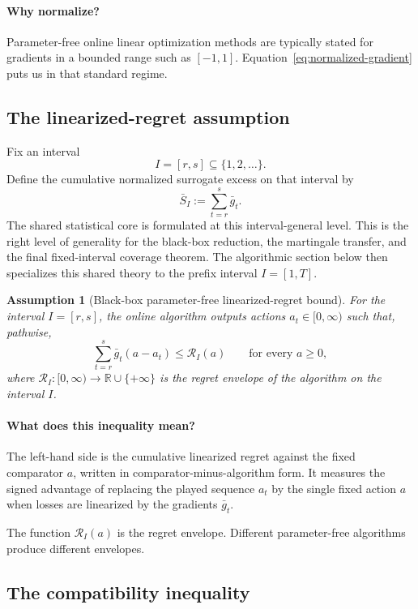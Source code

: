 \documentclass[11pt]{article}
\newtheorem{assumption}{Assumption}
\newcommand{\R}{\mathbb{R}}
\newcommand{\1}{\mathbf{1}}
\begin{document}
\paragraph{Why normalize?}
Parameter-free online linear optimization methods are typically stated for gradients in a bounded range such as $[-1,1]$. Equation~\eqref{eq:normalized-gradient} puts us in that standard regime.

\subsection{The linearized-regret assumption}

Fix an interval
\[
I=[r,s]\subseteq\{1,2,\dots\}.
\]
Define the cumulative normalized surrogate excess on that interval by
\[
\bar S_I:=\sum_{t=r}^s \bar g_t.
\]
The shared statistical core is formulated at this interval-general level. This is the right level of generality for the black-box reduction, the martingale transfer, and the final fixed-interval coverage theorem. The algorithmic section below then specializes this shared theory to the prefix interval $I=[1,T]$.

\begin{assumption}[Black-box parameter-free linearized-regret bound]
\label{ass:linreg-main}
For the interval $I=[r,s]$, the online algorithm outputs actions $a_t\in[0,\infty)$ such that, pathwise,
\begin{equation}
\label{eq:linreg-assumption}
\sum_{t=r}^s \bar g_t(a-a_t)\le \mathcal R_I(a)
\qquad\text{for every }a\ge 0,
\end{equation}
where $\mathcal R_I:[0,\infty)\to\R\cup\{+\infty\}$ is the regret envelope of the algorithm on the interval $I$.
\end{assumption}

\paragraph{What does this inequality mean?}
The left-hand side is the cumulative linearized regret against the fixed comparator $a$, written in comparator-minus-algorithm form. It measures the signed advantage of replacing the played sequence $a_t$ by the single fixed action $a$ when losses are linearized by the gradients $\bar g_t$.

The function $\mathcal R_I(a)$ is the regret envelope. Different parameter-free algorithms produce different envelopes.

\subsection{The compatibility inequality}
\end{document}

